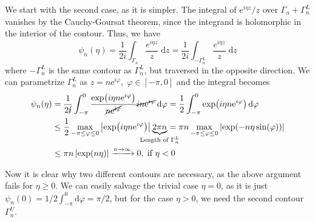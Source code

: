 We start with the second case, as it is simpler. The integral of \(e^{i \eta z}/z\) over \(\Gamma_n + \Gamma_n^L\) vanishes
by the Cauchy-Goursat theorem, since the integrand is holomorphic in the interior of the contour. Thus, we have
\begin{equation}
    \psi _n(\eta ) = \frac{1}{2i} \int_{\Gamma_n} \frac{e^{i \eta z}}{z}\; \mathrm{d}z = \frac{1}{2i} \int_{-\Gamma_n^L} \frac{e^{i \eta z}}{z}\; \mathrm{d}z
\end{equation}
where \(-\Gamma_n^L\) is the same contour as \(\Gamma_n^L\), but traversed in the opposite direction. We can parametrize
\(\Gamma _n^L\) as \(z = n \mathrm{e}^{i \varphi },\; \varphi  \in \left[ -\pi , 0 \right]  \) and the integral becomes
\begin{align}
    \psi _n(\eta ) & = \frac{1}{2\cancel{i}} \int_{-\pi }^{0} \frac{\exp(i \eta  n \mathrm{e}^{i \varphi }) } {\cancel{n \mathrm{e^{i \varphi }}} }
    \cancel{i n \mathrm{e}^{i \varphi }}  \,\mathrm{d}\varphi = \frac{1}{2}\int_{-\pi }^{0} \exp (i \eta  n \mathrm{e}^{i \varphi } )  \,\mathrm{d}\varphi \nonumber                   \\
                   & \leq \frac{1}{2} \max_{-\pi \leq \varphi \leq 0 }\abs{\exp (i \eta  n \mathrm{e}^{i \varphi } ) } \underbrace{2 \pi  n}_{\mathclap{\text{Length of }\Gamma_n^L }}
    = \pi  n \max_{-\pi \leq \varphi \leq 0}\left\vert \exp(-n \eta \sin (\varphi )) \right\vert \nonumber                                                                             \\
                   & \leq \pi  n \left\vert \exp (n \eta ) \right\vert \xrightarrow{n\to \infty } 0,\; \text{if } \eta  < 0
\end{align}

Now it is clear why two different contours are necessary, as the above argument fails for \(\eta \geq 0\).
We can easily salvage the trivial case \(\eta = 0\), as it is just \(\psi_n(0) = 1/2 \int_{-\pi }^{0} \mathrm{d} \varphi = \pi /2\),
but for the case \(\eta  > 0\), we need the second contour \(\Gamma _n^U\).

